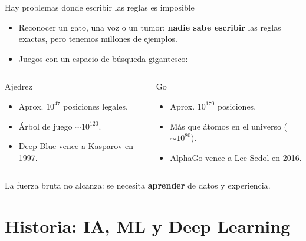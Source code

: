 \documentclass[aspectratio=169]{beamer}
\begin{document}
\begin{frame}{Hay problemas donde escribir las reglas es imposible}
  \begin{itemize}
    \item Reconocer un gato, una voz o un tumor: \textbf{nadie sabe escribir} las
          reglas exactas, pero tenemos millones de ejemplos.
    \item Juegos con un espacio de b\'usqueda gigantesco:
  \end{itemize}
  \vspace{0.4em}
  \begin{columns}[t]
      \begin{block}{Ajedrez}
        \begin{itemize}
          \item Aprox. $10^{47}$ posiciones legales.
          \item \'Arbol de juego $\sim 10^{120}$.
          \item Deep Blue vence a Kasparov en 1997.
        \end{itemize}
      \end{block}
      \begin{block}{Go}
        \begin{itemize}
          \item Aprox. $10^{170}$ posiciones.
          \item M\'as que \'atomos en el universo ($\sim 10^{80}$).
          \item AlphaGo vence a Lee Sedol en 2016.
        \end{itemize}
      \end{block}
  \end{columns}
  \vspace{0.3em}
  La fuerza bruta no alcanza: se necesita \textbf{aprender} de datos y experiencia.
\end{frame}

\section{Historia: IA, ML y Deep Learning}
\end{document}
